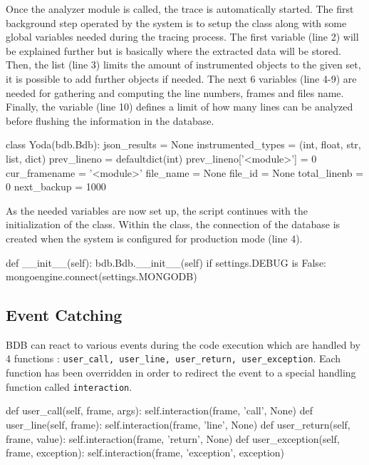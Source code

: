 Once the analyzer module is called, the trace is automatically started. The first background step operated by the system is to setup the  class along with some global variables needed during the tracing process. The first variable  (line 2) will be explained further but is basically where the extracted data will be stored. Then, the  list (line 3) limits the amount of instrumented objects to the given set, it is possible to add further objects if needed. The next 6 variables (line 4-9) are needed for gathering and computing the line numbers, frames and files name. Finally, the  variable (line 10) defines a limit of how many lines can be analyzed before flushing the information in the database.

\begin{python}
class Yoda(bdb.Bdb):
    json_results = None
    instrumented_types = (int, float, str, list, dict)
    prev_lineno = defaultdict(int)
    prev_lineno['<module>'] = 0 
    cur_framename = '<module>'
    file_name = None
    file_id = None 
    total_linenb = 0
    next_backup = 1000
\end{python}

As the needed variables are now set up, the script continues with the initialization of the  class. Within the class, the connection of the database is created when the system is configured for production mode (line 4). 

\begin{python}
def __init__(self):
    bdb.Bdb.__init__(self)
    if settings.DEBUG is False:
        mongoengine.connect(settings.MONGODB)
\end{python}

\subsection{Event Catching}

BDB can react to various events during the code execution which are handled by 4 functions : \texttt{user\_call, user\_line, user\_return, user\_exception}. Each function has been overridden in order to redirect the event to a special handling function called \texttt{interaction}. 
\smallskip
\begin{python}
def user_call(self, frame, args):
    self.interaction(frame, 'call', None)
def user_line(self, frame):
    self.interaction(frame, 'line', None)
def user_return(self, frame, value):
    self.interaction(frame, 'return', None)
def user_exception(self, frame, exception):
    self.interaction(frame, 'exception', exception)
\end{python}

